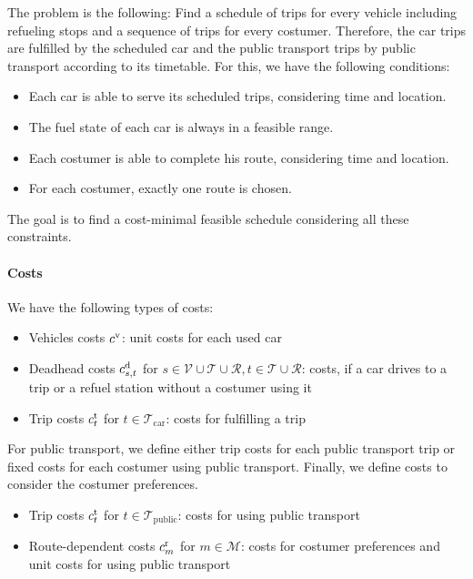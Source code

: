 The problem is the following: Find a schedule of trips for every vehicle including refueling stops and a sequence of trips for every costumer. Therefore, the car trips are fulfilled by the scheduled car and the public transport trips by public transport according to its timetable. For this, we have the following conditions:

\begin{itemize}
	\item{Each car is able to serve its scheduled trips, considering time and location.}
	\item{The fuel state of each car is always in a feasible range.}
	\item{Each costumer is able to complete his route, considering time and location.}
	\item{For each costumer, exactly one route is chosen.}
\end{itemize}

The goal is to find a cost-minimal feasible schedule considering all these constraints.

\paragraph{Costs} \parfill

We have the following types of costs:

\begin{itemize}
	\item{Vehicles costs $c^{\operatorname{v}}$: unit costs for each used car}
	\item{Deadhead costs $c^{\operatorname{d}}_{s,t}$ for $s\in\mathcal{V}\cup\mathcal{T}\cup\mathcal{R}, t\in\mathcal{T}\cup\mathcal{R}$: costs, if a car drives to a trip or a refuel station without a costumer using it}
	\item{Trip costs $c^{\operatorname{t}}_t$ for $t\in\mathcal{T}_{\operatorname{car}}$: costs for fulfilling a trip}
\end{itemize}

For public transport, we define either trip costs for each public transport trip or fixed costs for each costumer using public transport. Finally, we define costs to consider the costumer preferences.

\begin{itemize}
	\item{Trip costs $c^{\operatorname{t}}_t$ for $t\in\mathcal{T}_{\operatorname{public}}$: costs for using public transport}
	\item{Route-dependent costs $c^{\operatorname{r}}_m$ for $m\in\mathcal{M}$: costs for costumer preferences and unit costs for using public transport}
\end{itemize}

